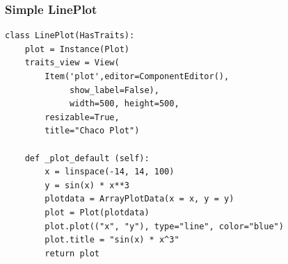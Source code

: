 \documentclass[14pt,compress]{beamer}
\begin{document}
\begin{frame}
\frametitle{Simple LinePlot}
\footnotesize
\begin{lstlisting}
class LinePlot(HasTraits):
    plot = Instance(Plot)
    traits_view = View(
        Item('plot',editor=ComponentEditor(), 
             show_label=False),
             width=500, height=500,
        resizable=True,
        title="Chaco Plot")

    def _plot_default (self):
        x = linspace(-14, 14, 100)
        y = sin(x) * x**3
        plotdata = ArrayPlotData(x = x, y = y)
        plot = Plot(plotdata)
        plot.plot(("x", "y"), type="line", color="blue")
        plot.title = "sin(x) * x^3"
        return plot
\end{lstlisting}
\end{frame}

%
%
%
%
%
\end{document}
